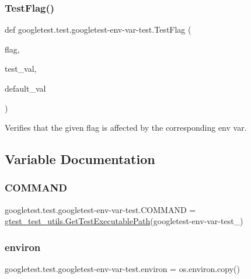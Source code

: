 \subsubsection{\texorpdfstring{TestFlag()}{TestFlag()}}
{\footnotesize\ttfamily def googletest.\+test.\+googletest-\/env-\/var-\/test.\+Test\+Flag (\begin{DoxyParamCaption}\item[{}]{flag,  }\item[{}]{test\+\_\+val,  }\item[{}]{default\+\_\+val }\end{DoxyParamCaption})}

\begin{DoxyVerb}Verifies that the given flag is affected by the corresponding env var.\end{DoxyVerb}
 

\subsection{Variable Documentation}
\mbox{\label{namespacegoogletest_1_1test_1_1googletest-env-var-test_a657d0124a8f8f4483cb4b7b2b33637f0}} 
\subsubsection{\texorpdfstring{COMMAND}{COMMAND}}
{\footnotesize\ttfamily googletest.\+test.\+googletest-\/env-\/var-\/test.\+C\+O\+M\+M\+A\+ND = \mbox{\hyperlink{namespacegoogletest_1_1test_1_1gtest__test__utils_ac9af888c702350aac56b154a6af34098}{gtest\+\_\+test\+\_\+utils.\+Get\+Test\+Executable\+Path}}(\textquotesingle{}googletest-\/env-\/var-\/test\+\_\+\textquotesingle{})}

\mbox{\label{namespacegoogletest_1_1test_1_1googletest-env-var-test_ae59e036a7b2f2404c117dffd12237ae7}} 
\subsubsection{\texorpdfstring{environ}{environ}}
{\footnotesize\ttfamily googletest.\+test.\+googletest-\/env-\/var-\/test.\+environ = os.\+environ.\+copy()}

